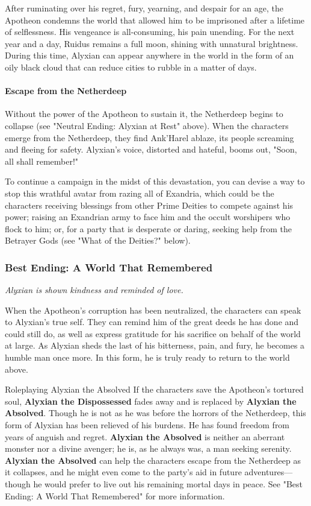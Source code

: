 \documentclass[a4paper, 11pt, bg=full, twocolumn, nooutline]{dndbook}
\begin{document}
After ruminating over his regret, fury, yearning, and despair for an age, the Apotheon condemns the world that allowed him to be imprisoned after a lifetime of selflessness. His vengeance is all-consuming, his pain unending. For the next year and a day, Ruidus remains a full moon, shining with unnatural brightness. During this time, Alyxian can appear anywhere in the world in the form of an oily black cloud that can reduce cities to rubble in a matter of days.

\paragraph{Escape from the Netherdeep}

Without the power of the Apotheon to sustain it, the Netherdeep begins to collapse (see "Neutral Ending: Alyxian at Rest" above). When the characters emerge from the Netherdeep, they find Ank'Harel ablaze, its people screaming and fleeing for safety. Alyxian's voice, distorted and hateful, booms out, "Soon, all shall remember!"

To continue a campaign in the midst of this devastation, you can devise a way to stop this wrathful avatar from razing all of Exandria, which could be the characters receiving blessings from other Prime Deities to compete against his power; raising an Exandrian army to face him and the occult worshipers who flock to him; or, for a party that is desperate or daring, seeking help from the Betrayer Gods (see "What of the Deities?" below).

\subsubsection{Best Ending: A World That Remembered}

\textit{Alyxian is shown kindness and reminded of love.}

When the Apotheon's corruption has been neutralized, the characters can speak to Alyxian's true self. They can remind him of the great deeds he has done and could still do, as well as express gratitude for his sacrifice on behalf of the world at large. As Alyxian sheds the last of his bitterness, pain, and fury, he becomes a humble man once more. In this form, he is truly ready to return to the world above.

\begin{DndSidebar}{Roleplaying Alyxian the Absolved}
If the characters save the Apotheon's tortured soul, \textbf{Alyxian the Dispossessed} fades away and is replaced by \textbf{Alyxian the Absolved}. Though he is not as he was before the horrors of the Netherdeep, this form of Alyxian has been relieved of his burdens. He has found freedom from years of anguish and regret. \textbf{Alyxian the Absolved} is neither an aberrant monster nor a divine avenger; he is, as he always was, a man seeking serenity.
\textbf{Alyxian the Absolved} can help the characters escape from the Netherdeep as it collapses, and he might even come to the party's aid in future adventures---though he would prefer to live out his remaining mortal days in peace. See "Best Ending: A World That Remembered" for more information.
\end{DndSidebar}
\end{document}
